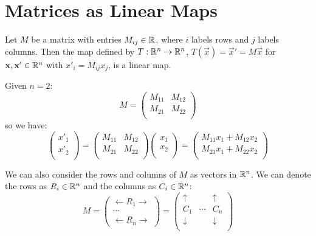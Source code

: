 \documentclass[../main.tex]{subfiles}
\begin{document}
\section{Matrices as Linear Maps}
Let $M$ be a matrix with entries $M_{i j} \in \mathbb{R}$, where $i$ labels rows and $j$ labels columns.
Then the map defined by $T: \mathbb{R}^{n} \to \mathbb{R}^{n}$, $T(\vec{x}) = \vec{x}' = M\vec{x}$ for $\boldsymbol{\mathbf{x}}, \boldsymbol{\mathbf{x}}' \in \mathbb{R}^{n}$ with $x'_i = M_{i j}x_j$, is a linear map.
\begin{example}
  Given $n = 2$:
  \[
    M = \begin{pmatrix}
    M_{1 1} & M_{1 2} \\
    M_{2 1} & M_{2 2} \\
    \end{pmatrix}
  \]
  so we have:
  \[
    \begin{pmatrix}
    x'_1 \\
    x'_2 \\
    \end{pmatrix}
    =
    \begin{pmatrix}
    M_{1 1} & M_{1 2} \\
    M_{2 1} & M_{2 2} \\
    \end{pmatrix}
    \begin{pmatrix}
    x_1 \\
    x_2 \\
    \end{pmatrix}
    =
    \begin{pmatrix}
    M_{1 1}x_1 + M_{1 2}x_2 \\
    M_{2 1}x_1 + M_{2 2}x_2 \\
    \end{pmatrix}
  \]
\end{example}
We can also consider the rows and columns of $M$ as vectors in $\mathbb{R}^{n}$.
We can denote the rows as $R_i \in \mathbb{R}^{n}$ and the columns as $C_i \in \mathbb{R}^{n}$:
\[
  M = \begin{pmatrix}
  \leftarrow R_1 \rightarrow \\
  \cdots \\
  \leftarrow R_n \rightarrow
  \end{pmatrix}
  =
  \begin{pmatrix}
  \uparrow & & \uparrow  \\
  C_1 & \cdots & C_n  \\
  \downarrow &  & \downarrow \\
  \end{pmatrix}
\]
\end{document}
